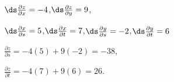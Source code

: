 {$\ds\frac{\partial z}{\partial x} = -4$,\quad $\ds\frac{\partial z}{\partial y} = 9$,

$\ds\frac{\partial x}{\partial s} = 5$,\quad $\ds\frac{\partial x}{\partial t} = 7$,\quad $\ds \frac{\partial y}{\partial s} = -2$,\quad $\ds \frac{\partial y}{\partial t} = 6$
}
{$\frac{\partial z}{\partial s} = -4(5)+9(-2) = -38$, 

$\frac{\partial z}{\partial t} = -4(7)+9(6) = 26$.
}
